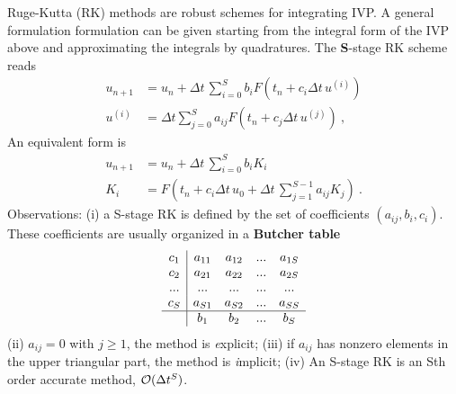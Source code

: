 \documentclass[11pt,a4paper,headinclude=true,DIV=14,BCOR=8mm,chapterprefix,listof=totoc,twoside,openright,abstracton]{scrbook}
\begin{document}
\begin{enumerate}
    Ruge-Kutta (RK) methods are robust schemes for integrating IVP. A
    general formulation formulation can be given starting from the
    integral form of the IVP above and approximating the integrals by quadratures. 
    The {\textbf S-stage RK} scheme reads 
    \begin{subequations}
      \begin{align}
        u_{n+1} &= u_n + \Delta t\, \sum_{i=0}^S b_i F(t_n + c_i\Delta t\, u^{(i)})\\
        u^{(i)} &= \Delta t\sum_{j=0}^S a_{ij}F(t_n+c_j\Delta t\, u^{(j)}) \ ,
      \end{align}
    \end{subequations}
    An equivalent form is
    \begin{subequations}
      \begin{align}
        u_{n+1} &= u_n + \Delta t\, \sum_{i=0}^S b_i K_i\\
        K_i &= F(t_n+c_i\Delta t\, u_0 + \Delta t\, \sum_{j=1}^{S-1} a_{ij}K_j) \ .
      \end{align}
    \end{subequations}
    Observations: (i) a S-stage RK is defined by the set of coefficients
    $(a_{ij},b_i,c_i)$. These coefficients are usually organized in a
  {\textbf{Butcher table}}%
  \begin{equation}
  \begin{array}
    {c|cccc}
    c_1 & a_{11} & a_{12} & ... & a_{1S}\\
    c_2 & a_{21} & a_{22} & ... & a_{2S}\\
    ... & ... & ... & ... & ...\\
    c_S & a_{S1} & a_{S2} &  ... & a_{SS}\\
    \hline
    & b_1 & b_2 & ... & b_S
  \end{array} 
  \end{equation}
  (ii) $a_{ij}=0$ with $j\geq1$, the method is {\textit explicit};
  (iii) if $a_{ij}$ has nonzero elements in the upper triangular part,
  the method is {\textit implicit};
  (iv) An S-stage RK is an Sth order accurate method, ${\cal O}(\Delta t^S)$.


\end{enumerate}
\end{document}
